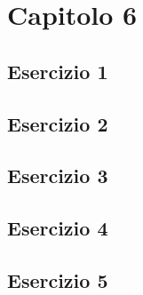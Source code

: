 \section{\textbf{Capitolo 6}}
\subsection{Esercizio 1}

\newpage
\subsection{Esercizio 2}

\newpage
\subsection{Esercizio 3}

\newpage
\subsection{Esercizio 4}

\newpage
\subsection{Esercizio 5}

\newpage